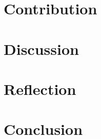 \documentclass[conference]{IEEEtran}
\begin{document}
\pagestyle{empty}

\pagebreak

\section{Contribution}
\label{sec:contribution}


\section{Discussion}
\label{sec:discussion}


\section{Reflection}
\label{sec:reflection}


\section{Conclusion}
\label{sec:conclusion}





\end{document}
